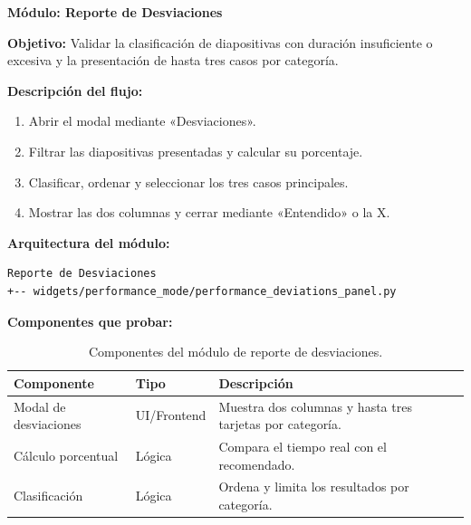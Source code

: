 \documentclass[12pt,letterpaper]{article}
\begin{document}
\clearpage
\textbf{Módulo: Reporte de Desviaciones}

\textbf{Objetivo:} Validar la clasificación de diapositivas con duración insuficiente o excesiva y la presentación de hasta tres casos por categoría.

\textbf{Descripción del flujo:}
\begin{enumerate}
\item Abrir el modal mediante «Desviaciones».
\item Filtrar las diapositivas presentadas y calcular su porcentaje.
\item Clasificar, ordenar y seleccionar los tres casos principales.
\item Mostrar las dos columnas y cerrar mediante «Entendido» o la X.
\end{enumerate}

\textbf{Arquitectura del módulo:}
\begin{verbatim}
Reporte de Desviaciones
+-- widgets/performance_mode/performance_deviations_panel.py
\end{verbatim}

\textbf{Componentes que probar:}
\begin{table}[H]
\centering
\begin{tabular}{|L{0.34\textwidth}|L{0.18\textwidth}|L{0.38\textwidth}|}
\hline
\textbf{Componente} & \textbf{Tipo} & \textbf{Descripción} \\ \hline
Modal de desviaciones & UI/Frontend & Muestra dos columnas y hasta tres tarjetas por categoría. \\ \hline
Cálculo porcentual & Lógica & Compara el tiempo real con el recomendado. \\ \hline
Clasificación & Lógica & Ordena y limita los resultados por categoría. \\ \hline
\end{tabular}
\caption{Componentes del módulo de reporte de desviaciones.}
\label{tab:componentes-modulo-desviaciones}
\end{table}
\end{document}
